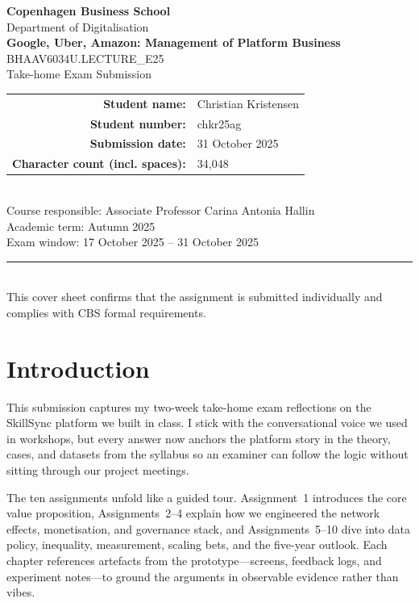 \documentclass[12pt,a4paper]{article}
\newcommand{\university}{Copenhagen Business School}
\newcommand{\faculty}{Department of Digitalisation}
\newcommand{\examTitle}{Google, Uber, Amazon: Management of Platform Business}
\newcommand{\examCode}{BHAAV6034U.LECTURE\_E25}
\newcommand{\examType}{Take-home Exam Submission}
\newcommand{\studentName}{Christian Kristensen}
\newcommand{\studentId}{chkr25ag}
\newcommand{\submissionDate}{31 October 2025}
\newcommand{\wordCount}{34,048}
\begin{document}
\begin{titlepage}
  \thispagestyle{empty}
  \centering
  {\Large \textbf{\university}}\\[0.5cm]
  {\large \faculty}\\[1.5cm]
  {\LARGE \textbf{\examTitle}}\\[0.5cm]
  {\large \examCode\\\examType}\\[1.5cm]
  \begin{tabular}{rl}
    \textbf{Student name:} & \studentName \\
    \textbf{Student number:} & \studentId \\
    \textbf{Submission date:} & \submissionDate \\
    \textbf{Character count (incl. spaces):} & \wordCount \\
  \end{tabular}\\[1.5cm]
  \vfill
  {\large Course responsible: Associate Professor Carina Antonia Hallin}\\[0.3cm]
  {\large Academic term: Autumn 2025}\\[0.3cm]
  {\large Exam window: 17 October 2025 -- 31 October 2025}\\[1.5cm]
  \rule{0.8\linewidth}{0.4pt}\\[0.5cm]
  {\small This cover sheet confirms that the assignment is submitted individually and complies with CBS formal requirements.}
\end{titlepage}

\setcounter{secnumdepth}{-1}
\makeatletter
\renewcommand{\numberline}[1]{}
\makeatother

\tableofcontents
\newpage

\section*{Introduction}
This submission captures my two-week take-home exam reflections on the SkillSync platform we built in class. I stick with the conversational voice we used in workshops, but every answer now anchors the platform story in the theory, cases, and datasets from the syllabus so an examiner can follow the logic without sitting through our project meetings.

The ten assignments unfold like a guided tour. Assignment~1 introduces the core value proposition, Assignments~2--4 explain how we engineered the network effects, monetisation, and governance stack, and Assignments~5--10 dive into data policy, inequality, measurement, scaling bets, and the five-year outlook. Each chapter references artefacts from the prototype---screens, feedback logs, and experiment notes---to ground the arguments in observable evidence rather than vibes.
\end{document}
